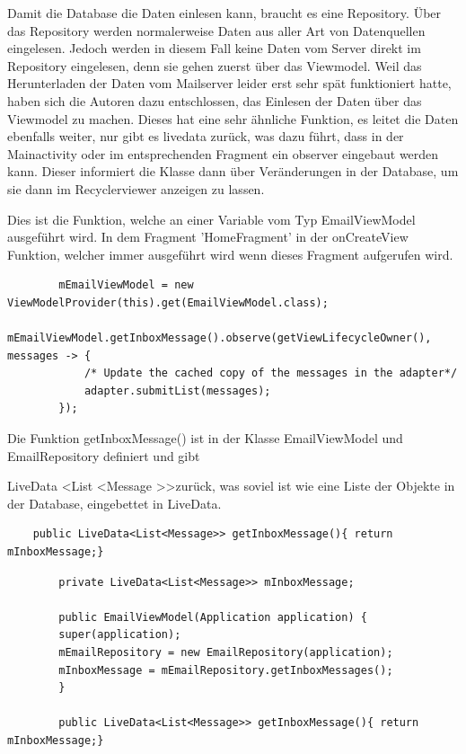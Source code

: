 \documentclass[a4paper,11pt]{article}
\begin{document}
Damit die Database die Daten einlesen kann, braucht es eine Repository. Über das Repository werden normalerweise Daten aus aller Art von Datenquellen eingelesen. Jedoch
werden in diesem Fall keine Daten vom Server direkt im Repository eingelesen, denn sie gehen zuerst über das Viewmodel.
Weil das Herunterladen der Daten vom Mailserver leider erst sehr spät funktioniert hatte, 
haben sich die Autoren dazu entschlossen, das Einlesen der Daten über das Viewmodel zu machen. Dieses hat eine sehr ähnliche Funktion, 
es leitet die Daten ebenfalls weiter, nur gibt es \gls{livedata} zurück, was dazu führt, dass in der Mainactivity oder im entsprechenden Fragment ein \gls{observer} 
eingebaut werden kann. Dieser informiert die Klasse dann über Veränderungen in der Database, um sie dann im Recyclerviewer anzeigen zu lassen. 
\cite{appStructurePicture}

Dies ist die Funktion, welche an einer Variable vom Typ EmailViewModel ausgeführt wird. In dem Fragment 'HomeFragment' in der
onCreateView Funktion, welcher immer ausgeführt wird wenn dieses Fragment aufgerufen wird. 


\lstset{language=java}
\begin{lstlisting}
        mEmailViewModel = new ViewModelProvider(this).get(EmailViewModel.class);
        mEmailViewModel.getInboxMessage().observe(getViewLifecycleOwner(), messages -> {
            /* Update the cached copy of the messages in the adapter*/
            adapter.submitList(messages);
        });
\end{lstlisting}

\begingroup
\nohyphenation

Die Funktion getInboxMessage() ist in der Klasse EmailViewModel und EmailRepository definiert und gibt 

LiveData \textless List \textless Message \textgreater \textgreater  zurück, was soviel ist wie eine Liste der Objekte in der Database, eingebettet 
in LiveData.

\endgroup

\lstset{language=java}
\begin{lstlisting}
    public LiveData<List<Message>> getInboxMessage(){ return mInboxMessage;}

\end{lstlisting}

\lstset{language=java}
\begin{lstlisting}
        private LiveData<List<Message>> mInboxMessage;

        public EmailViewModel(Application application) {
        super(application);
        mEmailRepository = new EmailRepository(application);
        mInboxMessage = mEmailRepository.getInboxMessages();
        }

        public LiveData<List<Message>> getInboxMessage(){ return mInboxMessage;}

\end{lstlisting}
\end{document}
